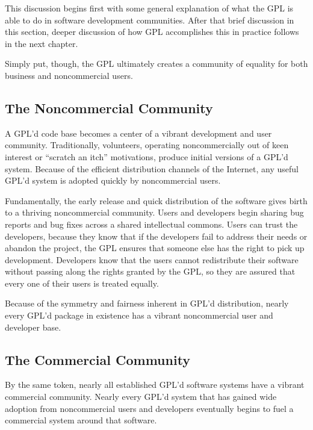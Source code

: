 This discussion begins first with some general explanation of what the GPL is
able to do in software development communities.  After that brief discussion
in this section, deeper discussion of how GPL accomplishes this in practice
follows in the next chapter.

Simply put, though, the GPL ultimately creates a community of equality for
both business and noncommercial users.

\subsection{The Noncommercial Community}

A GPL'd code base becomes a center of a vibrant development and user
community.  Traditionally, volunteers, operating noncommercially out of
keen interest or ``scratch an itch'' motivations, produce initial versions
of a GPL'd system.  Because of the efficient distribution channels of the
Internet, any useful GPL'd system is adopted quickly by noncommercial
users.

Fundamentally, the early release and quick distribution of the software
gives birth to a thriving noncommercial community.  Users and developers
begin sharing bug reports and bug fixes across a shared intellectual
commons.  Users can trust the developers, because they know that if the
developers fail to address their needs or abandon the project, the GPL
ensures that someone else has the right to pick up development.
Developers know that the users cannot redistribute their software without
passing along the rights granted by the GPL, so they are assured that every
one of their users is treated equally.

Because of the symmetry and fairness inherent in GPL'd distribution,
nearly every GPL'd package in existence has a vibrant noncommercial user
and developer base.

\subsection{The Commercial Community}

By the same token, nearly all established GPL'd software systems have a
vibrant commercial community.  Nearly every GPL'd system that has gained
wide adoption from noncommercial users and developers eventually begins
to fuel a commercial system around that software.

